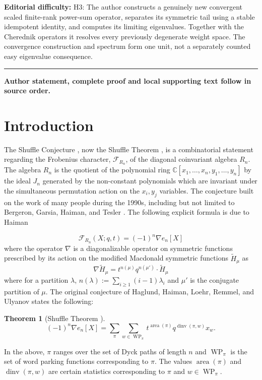 \documentclass[11pt]{article}
\newtheorem{thm}[theo]{Theorem}
\theoremstyle{definition}
\numberwithin{equation}{section}
\DeclareMathOperator{\WP}{WP}
\DeclareMathOperator{\area}{area}
\DeclareMathOperator{\dinv}{dinv}
\begin{document}
\par\noindent\textbf{Editorial difficulty:} H3: The author constructs a genuinely new convergent scaled finite-rank power-sum operator, separates its symmetric tail using a stable idempotent identity, and computes its limiting eigenvalues. Together with the Cherednik operators it resolves every previously degenerate weight space. The convergence construction and spectrum form one unit, not a separately counted easy eigenvalue consequence.
\medskip\hrule\medskip
\noindent\textbf{Author statement, complete proof and local supporting text follow in source order.}
\section{Introduction}\label{intro section}
The Shuffle Conjecture \cite{HHLRU-2003}, now the Shuffle Theorem \cite{CM_2015}, is a combinatorial statement regarding the Frobenius character, $\mathcal{F}_{R_n}$, of the diagonal coinvariant algebra $R_n.$ The algebra $R_n$ is the quotient of the polynomial ring $\mathbb{C}[x_1,\ldots,x_n,y_1,\ldots,y_n]$ by the ideal $J_n$ generated by the non-constant polynomials which are invariant under the simultaneous permutation action on the $x_i,y_j$ variables.
The conjecture built on the work of many people during the 1990s, including but not limited to Bergeron, Garsia, Haiman,  and Tesler \cite{BGSciFi, GHCat, BGHT}.
The following explicit formula is due to Haiman \cite{HVanish}

    $$ \mathcal{F}_{R_n}(X;q,t) = (-1)^n \nabla e_n[X] $$
    where the operator $\nabla$ is a diagonalizable operator on symmetric functions prescribed by its action on the modified Macdonald symmetric functions  $\widetilde{H}_{\mu}$  as
    $$\nabla \widetilde{H}_{\mu} = t^{n(\mu)} q^{n(\mu')}\cdot  \widetilde{H}_{\mu} $$ where for a partition $\lambda$, $n(\lambda):= \sum_{i \geq 1}(i-1)\lambda_i$ and $\mu'$ is the conjugate partition of $\mu.$
    The original conjecture of Haglund, Haiman, Loehr, Remmel, and Ulyanov \cite{HHLRU-2003} states the following:
        
\begin{thm}[Shuffle Theorem \cite{CM_2015}]

$$ (-1)^n \nabla e_n[X] = \sum_{\pi}\sum_{ w \in \WP_{\pi}} t^{\area(\pi)} q^{\dinv(\pi,w)} x_{w}. $$

\end{thm}

In the above, $\pi$ ranges over the set of Dyck paths of length $n$ and $\WP_{\pi}$ is the set of word parking functions corresponding to $\pi$. The values $\area(\pi)$ and $\dinv(\pi,w)$ are certain statistics corresponding to $\pi$ and $w \in \WP_{\pi}$.
\end{document}
